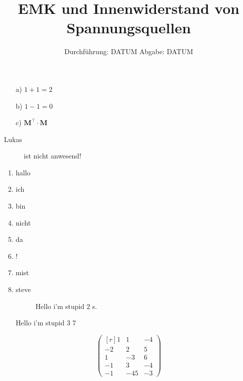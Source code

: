 

\subject{V301}
\title{EMK und Innenwiderstand von Spannungsquellen}
\date{
	Durchführung: DATUM
	\hspace{4em}
	Abgabe: DATUM
}


	\maketitle
	\newpage
	\tableofcontents
	\newpage
	\newpage
	
	
	
	\begin{itemize}
		\item[a)] $1+1=2$
		\item[b)] $1-1=0$
		\item[c)] $\symbf{M}^\top \cdot \symbf{M}$
	\end{itemize}
	\begin{description}
		\item[Lukas] ist nicht anwesend!
	\end{description}
	\begin{enumerate}
		\item hallo
		\item ich 
		\item bin
		\item nicht
		\item da
		\item !
		\item mist
		\item steve
		\begin{figure}
			Hello i'm stupid 2 s.~\cite{wingate}
		\end{figure}
		Hello i'm stupid 3 7
	\end{enumerate}
	\begin{displaymath}
		\begin{pmatrix*}[r]
		1 & 1 & -4 \\
		-2 & 2 & 5\\
		1 & -3 & 6 \\
		-1 & 3 & -4 \\
		-1 & -45 & -3
		\end{pmatrix*}
	\end{displaymath}
	
